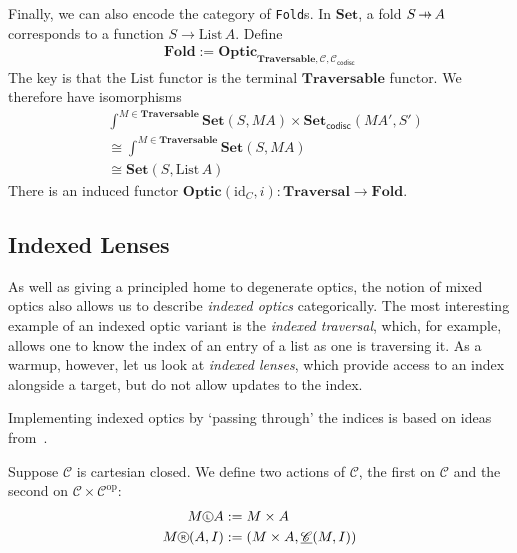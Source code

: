 \documentclass[11pt,letterpaper]{article}
\theoremstyle{plain}
\theoremstyle{definition}
\newcommand{\C}{\mathscr{C}}
\newcommand{\homC}{\underline{\C}}
\newcommand{\Set}{\mathbf{Set}}
\newcommand{\Traversable}{\mathbf{Traversable}}
\newcommand{\Optic}{\mathbf{Optic}}
\newcommand{\Traversal}{\mathbf{Traversal}}
\newcommand{\Fold}{\mathbf{Fold}}
\newcommand{\id}{\mathrm{id}}
\newcommand{\op}{\mathrm{op}}
\newcommand{\codisc}{\mathsf{codisc}}
\newcommand*\circled[1]{\tikz[baseline={([yshift=-0.65ex]current bounding box.center)}]{
   \node[shape=circle,draw,inner sep=1pt] (char) {#1};}}
\newcommand{\actL}{{\circled{\tiny$\mathsf{L}$}}}
\newcommand{\actR}{{\circled{\tiny$\mathsf{R}$}}}
\newcommand{\hto}{\ensuremath{\,\mathaccent\shortmid\rightarrow\,}}
\begin{document}
Finally, we can also encode the category of \texttt{Fold}s. In $\Set$, a fold $S \hto A$ corresponds to a function $S \to \mathrm{List}\,A$. Define 
\begin{align*}
\Fold := \Optic_{\Traversable, \C, \C_\codisc}
\end{align*}
The key is that the $\mathrm{List}$ functor is the terminal $\Traversable$ functor. We therefore have isomorphisms
\begin{align*}
&\int^{M \in \Traversable} \Set(S, MA) \times \Set_\codisc(MA', S') \\
&\cong \int^{M \in \Traversable} \Set(S, MA) \\
&\cong \Set(S, \mathrm{List}\,A)
\end{align*}
There is an induced functor $\Optic(\id_C, i) : \Traversal \to \Fold$.

\subsection{Indexed Lenses}
As well as giving a principled home to degenerate optics, the notion of mixed optics also allows us to describe \emph{indexed optics} categorically. The most interesting example of an indexed optic variant is the \emph{indexed traversal}, which, for example, allows one to know the index of an entry of a list as one is traversing it. As a warmup, however, let us look at \emph{indexed lenses}, which provide access to an index alongside a target, but do not allow updates to the index.

Implementing indexed optics by `passing through' the indices is based on ideas from~\cite{IndexedOpticsPost}.

Suppose $\C$ is cartesian closed. We define two actions of $\C$, the first on $\C$ and the second on $\C \times \C^\op$:
\begin{align*}
M \actL A  &:= M \times A\\
M \actR (A, I) &:= (M \times A, \homC(M, I))
\end{align*}
\end{document}
